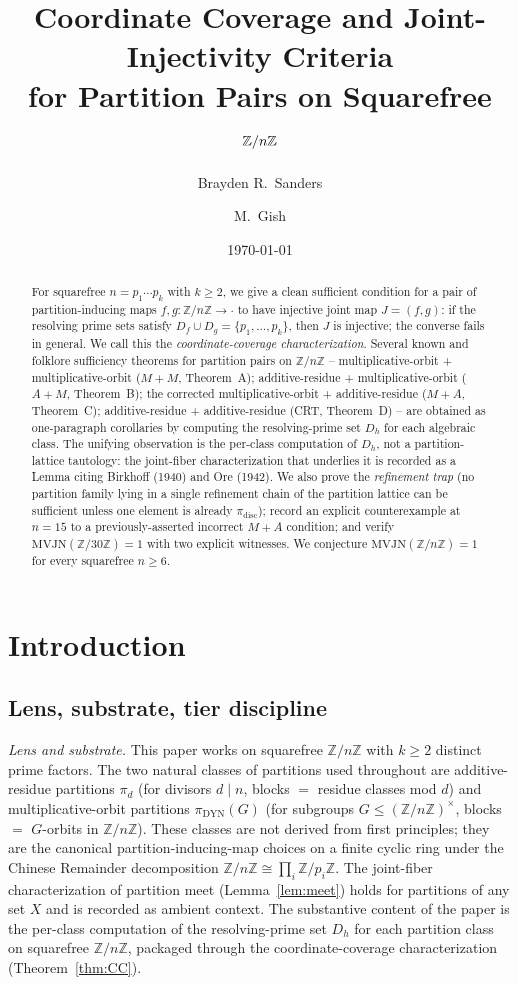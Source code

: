 \documentclass[11pt,reqno]{amsart}
\title[Coordinate Coverage and Joint-Injectivity]{%
Coordinate Coverage and Joint-Injectivity Criteria \\
for Partition Pairs on Squarefree $\Z/n\Z$}
\author{Brayden R.\ Sanders}
\author{M.\ Gish}
\date{\today}
\theoremstyle{plain}
\theoremstyle{definition}
\newcommand{\Z}{\mathbb{Z}}
\newcommand{\Zn}{\Z/n\Z}
\newcommand{\Zns}{(\Z/n\Z)^{\times}}
\newcommand{\disc}{\mathrm{disc}}
\newcommand{\DYN}{\mathrm{DYN}}
\begin{document}
\begin{abstract}
For squarefree $n = p_1 \cdots p_k$ with $k \geq 2$, we give a clean
sufficient condition for a pair of partition-inducing maps
$f, g\colon \Zn \to \cdot$ to have injective joint map $J = (f, g)$:
if the resolving prime sets satisfy
$D_f \cup D_g = \{p_1, \ldots, p_k\}$, then $J$ is injective; the
converse fails in general. We call this the \emph{coordinate-coverage
characterization}. Several known and folklore sufficiency theorems for
partition pairs on $\Zn$ -- multiplicative-orbit + multiplicative-orbit
($M{+}M$, Theorem~A); additive-residue + multiplicative-orbit
($A{+}M$, Theorem~B); the corrected multiplicative-orbit +
additive-residue ($M{+}A$, Theorem~C); additive-residue +
additive-residue (CRT, Theorem~D) -- are obtained as one-paragraph
corollaries by computing the resolving-prime set $D_h$ for each
algebraic class. The unifying observation is the per-class computation
of $D_h$, not a partition-lattice tautology: the joint-fiber
characterization that underlies it is recorded as a Lemma citing
Birkhoff (1940) and Ore (1942). We also prove the \emph{refinement
trap} (no partition family lying in a single refinement chain of the
partition lattice can be sufficient unless one element is already
$\pi_{\disc}$); record an explicit counterexample at $n = 15$ to a
previously-asserted incorrect $M{+}A$ condition; and verify
$\mathrm{MVJN}(\Z/30\Z) = 1$ with two explicit witnesses. We
conjecture $\mathrm{MVJN}(\Zn) = 1$ for every squarefree $n \geq 6$.
\end{abstract}

\maketitle

\section{Introduction} \label{sec:intro}

\subsection{Lens, substrate, tier discipline} \label{ssec:lens}

\emph{Lens and substrate.} This paper works on squarefree $\Zn$ with
$k \geq 2$ distinct prime factors. The two natural classes of
partitions used throughout are additive-residue partitions $\pi_d$
(for divisors $d \mid n$, blocks $=$ residue classes mod $d$) and
multiplicative-orbit partitions $\pi_{\DYN}(G)$ (for subgroups
$G \leq \Zns$, blocks $=$ $G$-orbits in $\Zn$). These classes are not
derived from first principles; they are the canonical
partition-inducing-map choices on a finite cyclic ring under the
Chinese Remainder decomposition $\Zn \cong \prod_{i} \Z/p_i\Z$. The
joint-fiber characterization of partition meet (Lemma~\ref{lem:meet})
holds for partitions of any set $X$ and is recorded as ambient
context. The substantive content of the paper is the per-class
computation of the resolving-prime set $D_h$ for each partition class
on squarefree $\Zn$, packaged through the coordinate-coverage
characterization (Theorem~\ref{thm:CC}).
\end{document}
